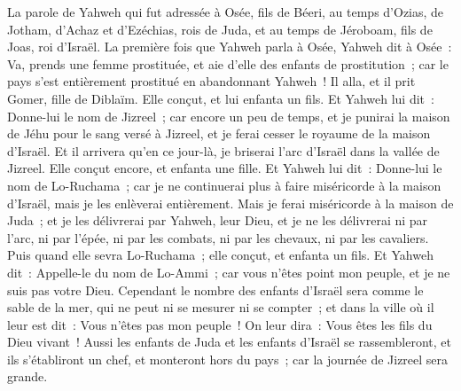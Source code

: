 \begin{multicols}{2}
\VerseOne{}La parole de Yahweh qui fut adressée à Osée, fils de Béeri, au temps d'Ozias, de Jotham, d'Achaz et d'Ezéchias, rois de Juda, et au temps de Jéroboam, fils de Joas, roi d'Israël.
La première fois que Yahweh parla à Osée, Yahweh dit à Osée~: Va, prends une femme prostituée, et aie d'elle des enfants de prostitution~; car le pays s'est entièrement prostitué en abandonnant Yahweh~!
Il alla, et il prit Gomer, fille de Diblaïm. Elle conçut, et lui enfanta un fils.
Et Yahweh lui dit~: Donne-lui le nom de Jizreel~; car encore un peu de temps, et je punirai la maison de Jéhu pour le sang versé à Jizreel, et je ferai cesser le royaume de la maison d'Israël.
Et il arrivera qu'en ce jour-là, je briserai l'arc d'Israël dans la vallée de Jizreel.
Elle conçut encore, et enfanta une fille. Et Yahweh lui dit~: Donne-lui le nom de Lo-Ruchama~; car je ne continuerai plus à faire miséricorde à la maison d'Israël, mais je les enlèverai entièrement.
Mais je ferai miséricorde à la maison de Juda~; et je les délivrerai par Yahweh, leur Dieu, et je ne les délivrerai ni par l'arc, ni par l'épée, ni par les combats, ni par les chevaux, ni par les cavaliers.
Puis quand elle sevra Lo-Ruchama~; elle conçut, et enfanta un fils.
Et Yahweh dit~: Appelle-le du nom de Lo-Ammi~; car vous n'êtes point mon peuple, et je ne suis pas votre Dieu.
\VerseOne{}Cependant le nombre des enfants d'Israël sera comme le sable de la mer, qui ne peut ni se mesurer ni se compter~; et dans la ville où il leur est dit~: Vous n'êtes pas mon peuple~! On leur dira~: Vous êtes les fils du Dieu vivant~!
Aussi les enfants de Juda et les enfants d'Israël se rassembleront, et ils s'établiront un chef, et monteront hors du pays~; car la journée de Jizreel sera grande.

\end{multicols}
